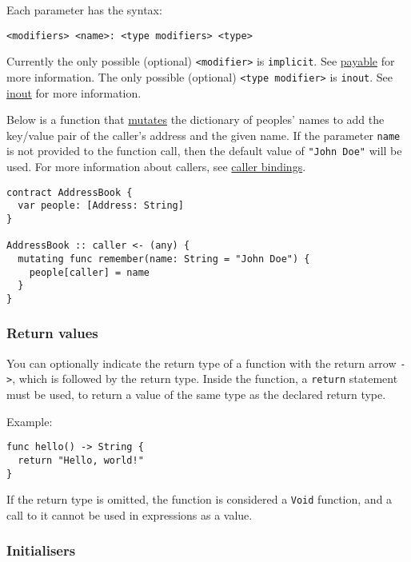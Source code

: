 Each parameter has the syntax:

\begin{verbatim}
<modifiers> <name>: <type modifiers> <type>
\end{verbatim}

Currently the only possible (optional) \texttt{<modifier>} is \texttt{implicit}. See \hyperref[sec:appendix-b-payable]{payable} for more information. The only possible (optional) \texttt{<type modifier>} is \texttt{inout}. See \hyperref[sec:appendix-b-structs-as-function-arguments]{inout} for more information.

Below is a function that \hyperref[sec:appendix-b-function-modifiers]{mutates} the dictionary of peoples' names to add the key/value pair of the caller's address and the given name. If the parameter \texttt{name} is not provided to the function call, then the default value of \texttt{"John Doe"} will be used. For more information about callers, see \hyperref[sec:appendix-b-caller-group-variable]{caller bindings}.

\begin{verbatim}
contract AddressBook {
  var people: [Address: String]
}

AddressBook :: caller <- (any) {
  mutating func remember(name: String = "John Doe") {
    people[caller] = name
  }
}
\end{verbatim}

\subsubsection{Return values}
\label{sec:appendix-b-return-values}

You can optionally indicate the return type of a function with the return arrow \texttt{->}, which is followed by the return type. Inside the function, a \texttt{return} statement must be used, to return a value of the same type as the declared return type.

Example:

\begin{verbatim}
func hello() -> String {
  return "Hello, world!"
}
\end{verbatim}

If the return type is omitted, the function is considered a \texttt{Void} function, and a call to it cannot be used in expressions as a value.

\subsubsection{Initialisers}
\label{sec:appendix-b-initialisers}

